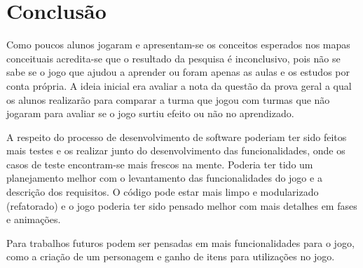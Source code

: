 \chapter[Conclusão]{Conclusão}

Como poucos alunos jogaram e apresentam-se os conceitos esperados nos mapas conceituais acredita-se que o resultado da pesquisa é inconclusivo, pois não se sabe se o jogo que ajudou a aprender ou foram apenas as aulas e os estudos por conta própria. A ideia inicial era avaliar a nota da questão da prova geral a qual os alunos realizarão para comparar a turma que jogou com turmas que não jogaram para avaliar se o jogo surtiu efeito ou não no aprendizado.


A respeito do processo de desenvolvimento de software poderiam ter sido feitos mais testes e os realizar junto do desenvolvimento das funcionalidades, onde os casos de teste encontram-se mais frescos na mente. Poderia ter tido um planejamento melhor com o levantamento das funcionalidades do jogo e a descrição dos requisitos. O código pode estar mais limpo e modularizado (refatorado) e o jogo poderia ter sido pensado melhor com mais detalhes em fases e animações.

Para trabalhos futuros podem ser pensadas em mais funcionalidades para o jogo, como a criação de um personagem e ganho de itens para utilizações no jogo.
